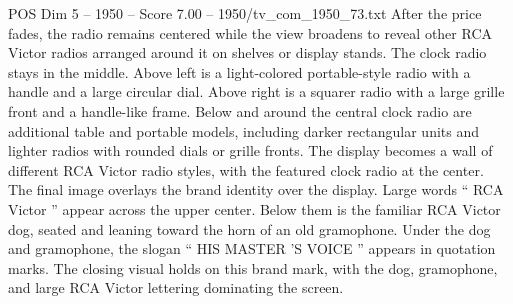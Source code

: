 \begin{textsample}{POS Dim 5 – 1950 – Score 7.00 – 1950/tv\_com\_1950\_73.txt}
After the price fades, the radio remains centered while the view broadens to reveal other RCA Victor radios arranged around it on shelves or display stands.
The clock radio stays in the middle.
Above left is a light-colored portable-style radio with a handle and a large circular dial.
Above right is a squarer radio with a large grille front and a handle-like frame.
Below and around the central clock radio are additional table and portable models, including darker rectangular units and lighter radios with rounded dials or grille fronts.
The display becomes a wall of different RCA Victor radio styles, with the featured clock radio at the center.
The final image overlays the brand identity over the display.
Large words “ RCA Victor ” appear across the upper center.
Below them is the familiar RCA Victor dog, seated and leaning toward the horn of an old gramophone.
Under the dog and gramophone, the slogan “ HIS MASTER ’S VOICE ” appears in quotation marks.
The closing visual holds on this brand mark, with the dog, gramophone, and large RCA Victor lettering dominating the screen.

\end{textsample}
